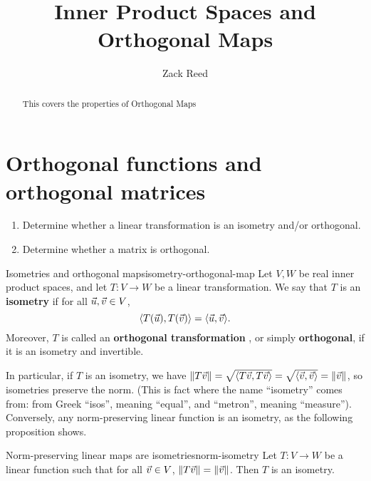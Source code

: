 \documentclass{ximera}
\author{Zack Reed}
\title{Inner Product Spaces and Orthogonal Maps}
\begin{document}
\begin{abstract}

    This covers the properties of Orthogonal Maps

\end{abstract}
\maketitle



\section{Orthogonal functions and orthogonal matrices}
\label{sec:orthogonal-matrices}

  \begin{enumerate}
  \item Determine whether a linear transformation is an isometry
    and/or orthogonal.
  \item Determine whether a matrix is orthogonal.
  \end{enumerate}

\begin{definition}{Isometries and orthogonal maps}{isometry-orthogonal-map}
  Let $V,W$ be real inner product spaces, and let $T:V\to W$ be a
  linear transformation. We say that $T$ is an \textbf{isometry}%
   if for all
  $\vec{u},\vec{v}\in V$,
  \begin{equation*}
    \langle T(\vec{u}),T(\vec{v}) \rangle = \langle \vec{u},\vec{v} \rangle.
  \end{equation*}
  Moreover, $T$ is called an \textbf{orthogonal transformation}%
  , or simply
  \textbf{orthogonal}, if it is an isometry and invertible.
\end{definition}

In particular, if $T$ is an isometry, we have
$\left\|T\vec{v}\right\| = \sqrt{\langle T\vec{v},T\vec{v} \rangle} =
\sqrt{\langle \vec{v},\vec{v} \rangle} = \left\|\vec{v}\right\|$, so isometries
preserve the norm. (This is fact where the name ``isometry'' comes
from: from Greek ``isos'', meaning ``equal'', and ``metron'', meaning
``measure''). Conversely, any norm-preserving linear function is an
isometry, as the following proposition shows.

\begin{proposition}{Norm-preserving linear maps are isometries}{norm-isometry}
  Let $T:V\to W$ be a linear function such that for all
  $\vec{v}\in V$, $\left\|T\vec{v}\right\| = \left\|\vec{v}\right\|$. Then $T$ is
  an isometry.
\end{proposition}
\end{document}
